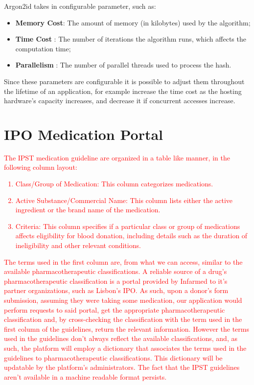 Argon2id takes in configurable parameter, such as:
\begin{itemize}
	\item \textbf{Memory Cost}: The amount of memory (in kilobytes) used by the algorithm;
	\item \textbf{Time Cost} : The number of iterations the algorithm runs, which affects the computation time;
	\item \textbf{Parallelism} : The number of parallel threads used to process the hash.
\end{itemize}

Since these parameters are configurable it is possible to adjust them throughout the lifetime of an application, for example increase the time cost as the hosting hardware's capacity increases, and decrease it if concurrent accesses increase.

\section{IPO Medication Portal}
\textcolor{red}{
	The IPST medication guideline are organized in a table like manner, in the following column layout:
	\begin{enumerate}
		\item Class/Group of Medication: This column categorizes medications.
		\item Active Substance/Commercial Name: This column lists either the active ingredient or the brand name of the medication.
		\item Criteria: This column specifies if a particular class or group of medications affects eligibility for blood donation, including details such as the duration of ineligibility and other relevant conditions.
	\end{enumerate}
	The terms used in the first column are, from what we can access, similar to the available pharmacotherapeutic classifications. A reliable source of a drug's pharmacotherapeutic classification is a portal provided by Infarmed to it's partner organizations, such as Lisbon's IPO.
	As such, upon a donor's form submission, assuming they were taking some medication, our application would perform requests to said portal, get the appropriate pharmacotherapeutic classification and, by cross-checking the classification with the term used in the first column of the guidelines, return the relevant information.
	However the terms used in the guidelines don't always reflect the available classifications, and, as such, the platform will employ a dictionary that associates the terms used in the guidelines to pharmacotherapeutic classifications. This dictionary will be updatable by the platform's administrators.
	The fact that the IPST guidelines aren't available in a machine readable format persists.
}

